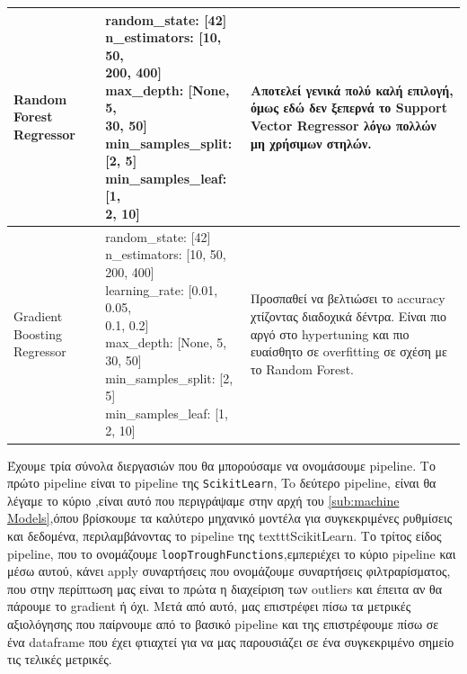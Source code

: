 \begin{table}[h!]
\begin{tabularx}{\textwidth}{|
>{\raggedright\arraybackslash}p{3cm} |
>{\raggedright\arraybackslash\small}p{4cm} |
X |
}
Random Forest Regressor
&
\makecell[l]{
random\_state: [42] \\
n\_estimators: [10, 50,\\ 200, 400] \\
max\_depth: [None, 5,\\ 30, 50] \\
min\_samples\_split: [2, 5] \\
min\_samples\_leaf: [1, \\ 2, 10]
}
&
Αποτελεί γενικά πολύ καλή επιλογή, όμως εδώ δεν ξεπερνά το Support Vector Regressor λόγω πολλών μη χρήσιμων στηλών. \\
\hline

Gradient Boosting Regressor
&
\makecell[l]{
random\_state: [42] \\
n\_estimators: [10, 50,\\ 200, 400] \\
learning\_rate: [0.01, 0.05,\\ 0.1, 0.2] \\
max\_depth: [None, 5,\\ 30, 50] \\
min\_samples\_split: [2, 5] \\
min\_samples\_leaf: [1, \\ 2, 10]
}
&
Προσπαθεί να βελτιώσει το accuracy χτίζοντας διαδοχικά δέντρα. Είναι πιο αργό στο hypertuning και πιο ευαίσθητο σε overfitting σε σχέση με το Random Forest. \\
\hline

\end{tabularx}
\end{table}


Έχουμε τρία σύνολα διεργασιών που θα μπορούσαμε να ονομάσουμε pipeline.
Το πρώτο pipeline είναι το pipeline της \texttt{Scikit\-Learn},
To δεύτερο pipeline,  είναι θα λέγαμε το κύριο ,είναι αυτό που περιγράψαμε στην αρχή του \autoref{sub:machine Models},όπου βρίσκουμε τα καλύτερο μηχανικό μοντέλα για συγκεκριμένες ρυθμίσεις και δεδομένα, περιλαμβάνοντας το pipeline της texttt{Scikit\-Learn}.
Το τρίτος είδος pipeline, που το ονομάζουμε \texttt{loopTroughFunctions},εμπεριέχει το κύριο pipeline και μέσω αυτού, κάνει apply  συναρτήσεις που ονομάζουμε συναρτήσεις φιλτραρίσματος,
που στην περίπτωση μας είναι το πρώτα η διαχείριση των outliers και έπειτα αν θα πάρουμε το gradient ή όχι.
Μετά από αυτό, μας επιστρέφει πίσω τα μετρικές αξιολόγησης που παίρνουμε από το βασικό pipeline και της επιστρέφουμε πίσω σε ένα dataframe που έχει φτιαχτεί για να μας παρουσιάζει σε ένα συγκεκριμένο σημείο τις τελικές μετρικές.

